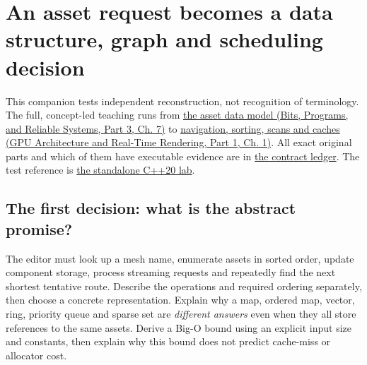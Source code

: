 \hypertarget{appendix-8a046b38375e}{}\label{referencestart:appendix-8a046b38375e}
\section{An asset request becomes a data structure, graph and scheduling decision}\label{appendix-8a046b38375e-an-asset-request-becomes-a-data-structure-graph-and-scheduling-decision}

\hypertarget{appendix-8a046b38375e-an-asset-request-becomes-a-data-structure-graph-and-scheduling-decision}{}

This companion tests independent reconstruction, not recognition of terminology. The full, concept-led teaching runs from \href{../01-Bits-Programs-and-Reliable-Systems-P03/main.pdf\#nameddest=01-foundations-i-ch007-the-scene-is-now-too-large-for-the-wrong-container-phase-5-m025m027-parts-401445}{the asset data model (Bits, Programs, and Reliable Systems, Part 3, Ch. 7)} to \href{../06-GPU-Architecture-and-Real-Time-Rendering-P01/main.pdf\#nameddest=01-foundations-i-ch008-from-an-asset-map-to-a-correct-navigable-world-phase-5-m028m030-parts-446500}{navigation, sorting, scans and caches (GPU Architecture and Real-Time Rendering, Part 1, Ch. 1)}. All exact original parts and which of them have executable evidence are in \hyperref[appendix-fd090d982a15-phase-5-algorithms-and-data-structure-workload-contracts-parts-401500]{the contract ledger}. The test reference is \hyperref[source-file-0ec69e1a1a11439bca29faa5]{the standalone C++20 lab}.

\subsection{The first decision: what is the abstract promise?}\label{appendix-8a046b38375e-the-first-decision-what-is-the-abstract-promise}

\hypertarget{appendix-8a046b38375e-the-first-decision-what-is-the-abstract-promise}{}

The editor must look up a mesh name, enumerate assets in sorted order, update component storage, process streaming requests and repeatedly find the next shortest tentative route. Describe the operations and required ordering separately, then choose a concrete representation. Explain why a map, ordered map, vector, ring, priority queue and sparse set are \emph{different answers} even when they all store references to the same assets. Derive a Big-O bound using an explicit input size and constants, then explain why this bound does not predict cache-miss or allocator cost.


